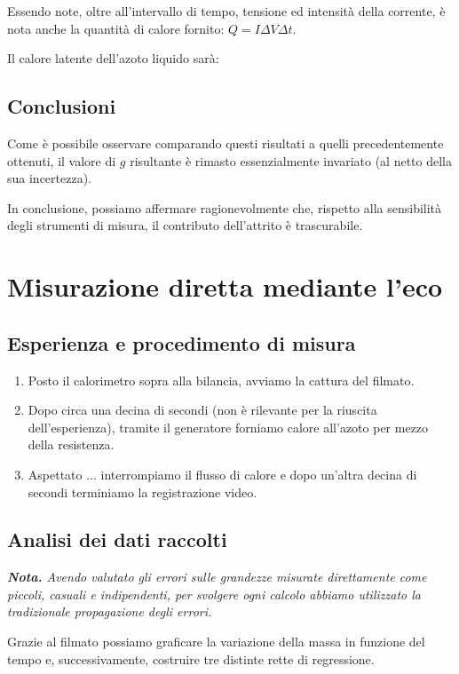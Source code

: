 \documentclass{article}
\begin{document}
  Essendo note, oltre all'intervallo di tempo, tensione ed intensità della corrente,
  è nota anche la quantità di calore fornito: $Q = I \Delta V \Delta t$.

  Il calore latente dell'azoto liquido sarà:

\subsection{Conclusioni}

Come è possibile osservare comparando questi risultati a
quelli precedentemente ottenuti, il valore di $g$ risultante
è rimasto essenzialmente invariato (al netto della sua incertezza).

In conclusione, possiamo affermare ragionevolmente che,
rispetto alla sensibilità degli strumenti di misura,
il contributo dell'attrito è trascurabile.

\section{Misurazione diretta mediante l'eco}

\subsection{Esperienza e procedimento di misura}

\begin{enumerate}
  \item
    Posto il calorimetro sopra alla bilancia, avviamo la cattura del filmato.
  \item
    Dopo circa una decina di secondi (non è rilevante per la riuscita dell'esperienza),
    tramite il generatore forniamo calore all'azoto per mezzo della resistenza.
  \item
    Aspettato ... interrompiamo il flusso di calore e dopo
    un'altra decina di secondi terminiamo la registrazione video.
\end{enumerate}

\subsection{Analisi dei dati raccolti}
\emph{\textbf{Nota.}
Avendo valutato gli errori sulle grandezze misurate direttamente
come piccoli, casuali e indipendenti, per svolgere ogni calcolo
abbiamo utilizzato la tradizionale propagazione degli errori.
}

  Grazie al filmato possiamo graficare la variazione della massa in funzione del tempo
  e, successivamente, costruire tre distinte rette di regressione.
\end{document}
